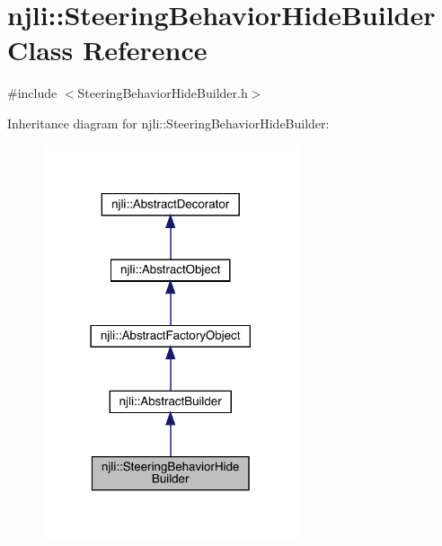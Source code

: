 \hypertarget{classnjli_1_1_steering_behavior_hide_builder}{}\section{njli\+:\+:Steering\+Behavior\+Hide\+Builder Class Reference}
\label{classnjli_1_1_steering_behavior_hide_builder}


{\ttfamily \#include $<$Steering\+Behavior\+Hide\+Builder.\+h$>$}



Inheritance diagram for njli\+:\+:Steering\+Behavior\+Hide\+Builder\+:\nopagebreak
\begin{figure}[H]
\begin{center}
\leavevmode
\includegraphics[width=213pt]{classnjli_1_1_steering_behavior_hide_builder__inherit__graph}
\end{center}
\end{figure}


